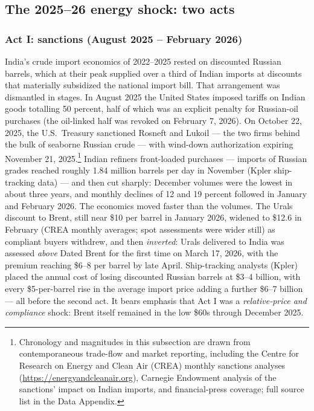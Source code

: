 \documentclass[12pt]{article}
\begin{document}
\subsection{The 2025--26 energy shock: two acts}\label{sec:shock}

\subsubsection*{Act I: sanctions (August 2025 -- February 2026)}

India's crude import economics of 2022--2025 rested on discounted Russian barrels, which at
their peak supplied over a third of Indian imports at discounts that materially subsidized
the national import bill. That arrangement was dismantled in stages. In August 2025 the
United States imposed tariffs on Indian goods totalling 50 percent, half of which was an
explicit penalty for Russian-oil purchases (the oil-linked half was revoked on February 7,
2026). On October 22, 2025, the U.S.\ Treasury sanctioned Rosneft and Lukoil --- the two
firms behind the bulk of seaborne Russian crude --- with wind-down authorization expiring
November 21, 2025.\footnote{Chronology and magnitudes in this
subsection are drawn from contemporaneous trade-flow and market reporting, including the
Centre for Research on Energy and Clean Air (CREA) monthly sanctions analyses
(\url{https://energyandcleanair.org}), Carnegie Endowment analysis of the sanctions' impact
on Indian imports, and financial-press coverage; full source list in the Data Appendix.}
Indian refiners front-loaded purchases --- imports of Russian grades reached roughly 1.84
million barrels per day in November (Kpler ship-tracking data) --- and then cut sharply:
December volumes were the lowest in about three years, and monthly declines of 12 and 19
percent followed in January and February 2026. The economics moved faster than the volumes.
The Urals discount to Brent, still near \$10 per barrel in January 2026, widened to \$12.6
in February (CREA monthly averages; spot assessments were wider still) as compliant buyers
withdrew, and then \emph{inverted}: Urals delivered to India was assessed
\emph{above} Dated Brent for the first time on March 17, 2026, with the premium reaching
\$6--8 per barrel by late April. Ship-tracking analysts (Kpler) placed the annual cost of
losing discounted Russian barrels at \$3--4 billion, with every \$5-per-barrel rise in the
average import price adding a further \$6--7 billion --- all before the second act. It bears
emphasis that Act I was a \emph{relative-price and compliance} shock: Brent itself remained
in the low \$60s through December 2025.
\end{document}
